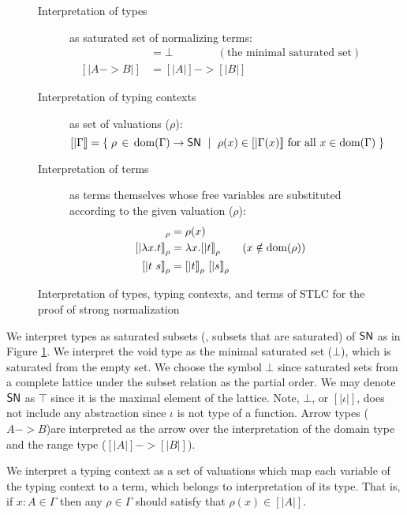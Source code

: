 \begin{figure}
\begin{singlespace}
\begin{description}
\item[Interpretation of types] as saturated set of normalizing terms:
\begin{align*}
[| \iota  |] &= \bot \qquad\qquad (\text{the minimal saturated set}) \\
[| A -> B |] &= [| A |] -> [| B |]
\end{align*}

\item[Interpretation of typing contexts] as set of valuations ($\rho$):
\[ [| \Gamma |] =
	\{\; \rho\,\in\,\mathop{\textrm{dom}}(\Gamma) -> \mathsf{SN} ~\mid~
             \rho(x) \in [|\Gamma(x)|] ~\text{for all}~x\in\mathop{\textrm{dom}}(\Gamma) \;\}
\]

\item[Interpretation of terms] as terms themselves whose free variables are
	substituted according to the given valuation ($\rho$):
\begin{align*}
[|x|]_\rho      &= \rho(x) \\
[|\l x.t|]_\rho &= \l x.[|t|]_\rho  \qquad (x\notin\dom(\rho)) \\
[|t~s|]_\rho    &= [|t|]_\rho~[|s|]_\rho
\end{align*}
\end{description}
\caption[Interpretation of STLC for proving strong normalization]
	{Interpretation of types, typing contexts, and terms of STLC
         for the proof of strong normalization}
\label{fig:interpSTLC}
\end{singlespace}
\end{figure}

We interpret types as saturated subsets (\ie, subsets that are saturated) of
$\mathsf{SN}$ as in Figure \ref{fig:interpSTLC}. We interpret the void type as
the minimal saturated set ($\bot$), which is saturated from the empty set.
We choose the symbol $\bot$ since saturated sets from a complete lattice
under the subset relation as the partial order. We may denote $\mathsf{SN}$ as $\top$
since it is the maximal element of the lattice. Note, $\bot$, or $[|\iota|]$,
does not include any abstraction since $\iota$ is not type of a function.
Arrow types ($A -> B$)are interpreted as the arrow over the interpretation of
the domain type and the range type ($[|A|] -> [|B|]$).

We interpret a typing context as a set of valuations which map
each variable of the typing context to a term, which belongs to interpretation
of its type. That is, if $x : A \in \Gamma$ then any $\rho \in \Gamma$ should
satisfy that $\rho(x) \in [|A|]$.

